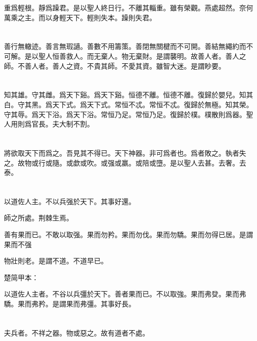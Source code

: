 \documentclass[a5paper]{ctexbook}
\begin{document}
    重爲輕根。靜爲躁君。是以聖人終日行。不離其輜重。雖有榮觀。燕處超然。奈何萬乘之主。而以身輕天下。輕則失本。躁則失君。

    \chapter{}

    善行無轍迹。善言無瑕讁。善數不用籌策。善閉無關楗而不可開。善結無繩約而不可解。是以聖人恒善救人。而无棄人。物无棄財。是謂襲明。故善人者。善人之師。不善人者。善人之資。不貴其師。不愛其資。雖智大迷。是謂眇要。

    \chapter{}

    知其雄。守其雌。爲天下谿。爲天下谿。恒德不離。恒德不離。復歸於嬰兒。知其白。守其黑。爲天下式。爲天下式。常恒不忒。常恒不忒。復歸於無極。知其榮。守其辱。爲天下浴。爲天下浴。常恒乃足。常恒乃足。復歸於樸。樸散則爲器。聖人用則爲官長。夫大制不割。

    \chapter{}

    將欲取天下而爲之。吾見其不得已。天下神器。非可爲者也。爲者敗之。執者失之。故物或行或隨。或歔或吹。或强或羸。或陪或墮。是以聖人去甚。去奢。去泰。

    \chapter{}

    以道佐人主。不以兵强於天下。其事好還。
    
    師之所處。荆棘生焉。
    
    善有果而已。不敢以取强。果而勿矜。果而勿伐。果而勿驕。果而勿得已居。是謂果而不强

    物壯則老。是謂不道。不道早已。

    楚简甲本：

    以道佐人主者。不谷以兵彊於天下。善者果而已。不以取強。果而弗癹。果而弗驕。果而弗矜。是謂果而弗彊。其事好長。

    \chapter{}

    夫兵者。不祥之器。物或惡之。故有道者不處。
\end{document}
